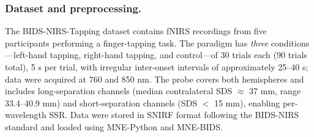 \documentclass[11pt]{article}
\def\,{ }%
\begin{document}
\subsubsection{Dataset and preprocessing.}

The BIDS-NIRS-Tapping dataset contains fNIRS recordings from five participants performing a finger-tapping task. The paradigm has \emph{three} conditions---left-hand tapping, right-hand tapping, and control---of 30 trials each (90 trials total), 5\,s per trial, with irregular inter-onset intervals of approximately 25--40\,s; data were acquired at 760 and 850\,nm. The probe covers both hemispheres and includes long-separation channels (median contralateral SDS $\approx$ 37\,mm, range 33.4--40.9\,mm) and short-separation channels (SDS $<$ 15\,mm), enabling per-wavelength SSR. Data were stored in SNIRF format following the BIDS-NIRS standard and loaded using MNE-Python and MNE-BIDS\cite{r37}.
\end{document}
